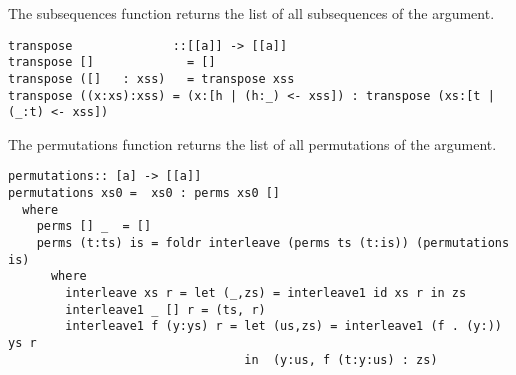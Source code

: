 The subsequences function returns the list of all subsequences of the argument.
\begin{lstlisting}[frame=single]
transpose              ::[[a]] -> [[a]]
transpose []             = []
transpose ([]   : xss)   = transpose xss
transpose ((x:xs):xss) = (x:[h | (h:_) <- xss]) : transpose (xs:[t | (_:t) <- xss])
\end{lstlisting}

The permutations function returns the list of all permutations of the argument.
\begin{lstlisting}[frame=single]
permutations:: [a] -> [[a]]
permutations xs0 =  xs0 : perms xs0 []
  where
    perms [] _  = []
    perms (t:ts) is = foldr interleave (perms ts (t:is)) (permutations is)
      where 
        interleave xs r = let (_,zs) = interleave1 id xs r in zs
        interleave1 _ [] r = (ts, r)
        interleave1 f (y:ys) r = let (us,zs) = interleave1 (f . (y:)) ys r
                                 in  (y:us, f (t:y:us) : zs)
\end{lstlisting}